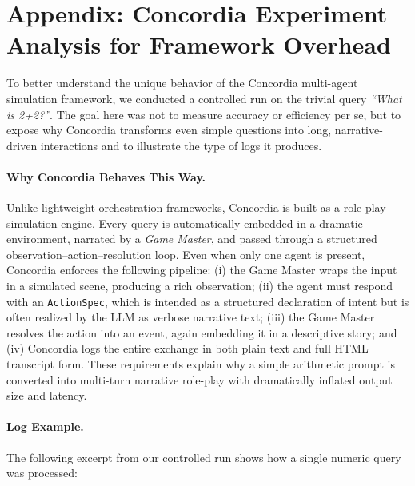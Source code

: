 


\newpage

\section{Appendix: Concordia Experiment Analysis for Framework Overhead}
\label{sec:concordia_appendix}




To better understand the unique behavior of the Concordia multi-agent simulation framework, we conducted a controlled run on the trivial query \emph{``What is 2+2?''}. The goal here was not to measure accuracy or efficiency per se, but to expose why Concordia transforms even simple questions into long, narrative-driven interactions and to illustrate the type of logs it produces.

\paragraph{Why Concordia Behaves This Way.}  
Unlike lightweight orchestration frameworks, Concordia is built as a role-play simulation engine. Every query is automatically embedded in a dramatic environment, narrated by a \emph{Game Master}, and passed through a structured observation–action–resolution loop. Even when only one agent is present, Concordia enforces the following pipeline: (i) the Game Master wraps the input in a simulated scene, producing a rich observation; (ii) the agent must respond with an \texttt{ActionSpec}, which is intended as a structured declaration of intent but is often realized by the LLM as verbose narrative text; (iii) the Game Master resolves the action into an event, again embedding it in a descriptive story; and (iv) Concordia logs the entire exchange in both plain text and full HTML transcript form. These requirements explain why a simple arithmetic prompt is converted into multi-turn narrative role-play with dramatically inflated output size and latency.

\paragraph{Log Example.}  
The following excerpt from our controlled run shows how a single numeric query was processed:  

